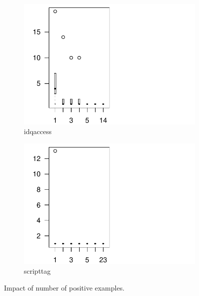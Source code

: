 \documentclass[sigconf,review, anonymous]{acmart}
\begin{document}
\begin{figure}[t!]
  \centering
  \begin{subfigure}{.2\textwidth}
    \centering
    \includegraphics[scale=0.4,trim=20 0 130 0,clip]{R/idqaccess/idqaccess.pdf}
    \caption{idqaccess}
  \end{subfigure}%
  \begin{subfigure}{.2\textwidth}
    \centering
    \includegraphics[scale=0.4,trim=15 0 130 0,clip]{R/scripttag/scripttag.pdf}
    \caption{scripttag}    
  \end{subfigure}%
\vspace{-2.5ex}  
\caption{Impact of number of positive examples.}
\label{fig:impact-number-attacks}
\vspace{1ex}
\end{figure}
\end{document}

